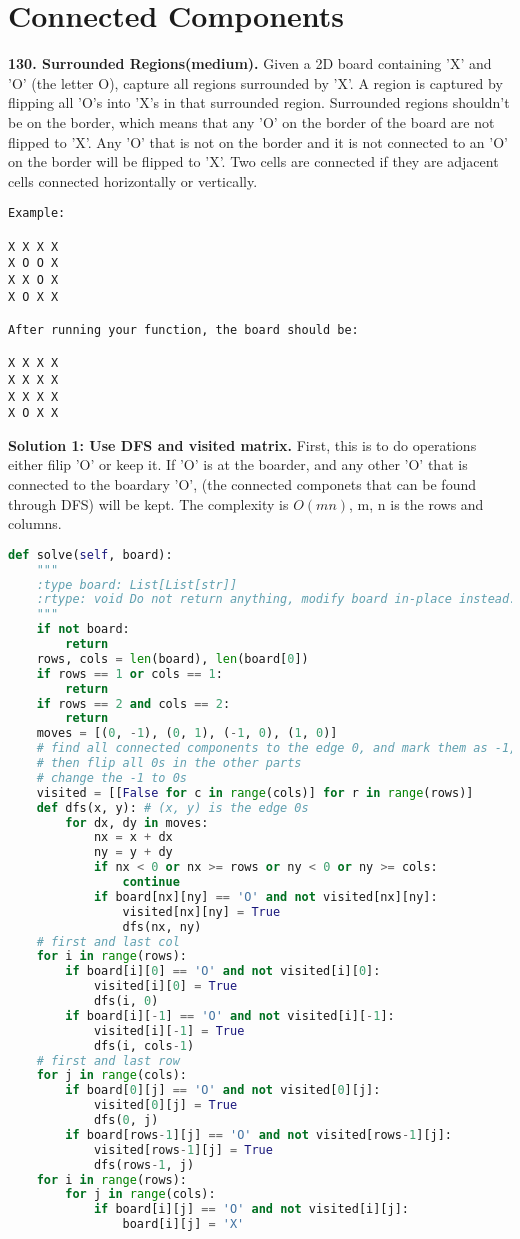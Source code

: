 \documentclass[../main.tex]{subfiles}
\begin{document}
\section{Connected Components}
\begin{examples}[resume]
\item \textbf{130. Surrounded Regions(medium).} Given a 2D board containing 'X' and 'O' (the letter O), capture all regions surrounded by 'X'. A region is captured by flipping all 'O's into 'X's in that surrounded region. Surrounded regions shouldn’t be on the border, which means that any 'O' on the border of the board are not flipped to 'X'. Any 'O' that is not on the border and it is not connected to an 'O' on the border will be flipped to 'X'. Two cells are connected if they are adjacent cells connected horizontally or vertically.
\begin{lstlisting}[numbers=none]
Example:

X X X X
X O O X
X X O X
X O X X

After running your function, the board should be:

X X X X
X X X X
X X X X
X O X X
\end{lstlisting}
\textbf{Solution 1: Use DFS and visited matrix.} First, this is to do operations either filip 'O' or keep it. If 'O' is at the boarder, and any other 'O' that is connected to the boardary 'O', (the connected componets that can be found through DFS) will be kept. The complexity is $O(mn)$, m, n is the rows and columns.
\begin{lstlisting}[language=Python]
def solve(self, board):
    """
    :type board: List[List[str]]
    :rtype: void Do not return anything, modify board in-place instead.
    """
    if not board:
        return
    rows, cols = len(board), len(board[0])
    if rows == 1 or cols == 1:
        return
    if rows == 2 and cols == 2:
        return 
    moves = [(0, -1), (0, 1), (-1, 0), (1, 0)]
    # find all connected components to the edge 0, and mark them as -1, 
    # then flip all 0s in the other parts
    # change the -1 to 0s
    visited = [[False for c in range(cols)] for r in range(rows)]
    def dfs(x, y): # (x, y) is the edge 0s
        for dx, dy in moves:
            nx = x + dx
            ny = y + dy
            if nx < 0 or nx >= rows or ny < 0 or ny >= cols:
                continue
            if board[nx][ny] == 'O' and not visited[nx][ny]:
                visited[nx][ny] = True
                dfs(nx, ny)
    # first and last col
    for i in range(rows):
        if board[i][0] == 'O' and not visited[i][0]:
            visited[i][0] = True
            dfs(i, 0)
        if board[i][-1] == 'O' and not visited[i][-1]:
            visited[i][-1] = True
            dfs(i, cols-1)
    # first and last row
    for j in range(cols):
        if board[0][j] == 'O' and not visited[0][j]:
            visited[0][j] = True
            dfs(0, j)
        if board[rows-1][j] == 'O' and not visited[rows-1][j]:
            visited[rows-1][j] = True
            dfs(rows-1, j)
    for i in range(rows):
        for j in range(cols):
            if board[i][j] == 'O' and not visited[i][j]:
                board[i][j] = 'X'
        

\end{lstlisting}
\end{examples}
\end{document}
